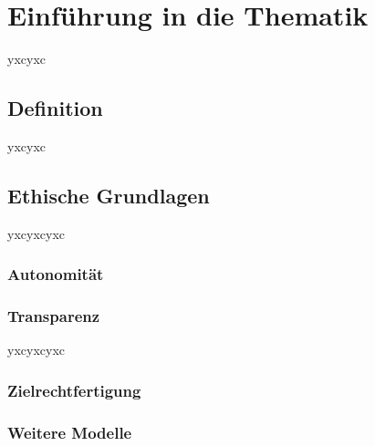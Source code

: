\chapter{Einführung in die Thematik}
yxcyxc
\section{Definition}
yxcyxc
\section{Ethische Grundlagen}
yxcyxcyxc
\subsection{Autonomität}
\subsection{Transparenz}
yxcyxcyxc
\subsection{Zielrechtfertigung}
\subsection{Weitere Modelle}
